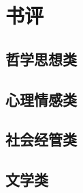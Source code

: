 \listoffigures

\clearpage

\listoftables

\clearpage


\chapter{书评}

\section{哲学思想类}























\clearpage

\section{心理情感类}


\clearpage

\section{社会经管类}














\clearpage

\section{文学类}

